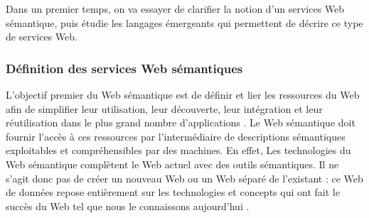 	    Dans un premier temps, on va essayer de clarifier la notion d'un services Web sémantique,
	    puis étudie les langages émergeants qui permettent de décrire ce type de services Web.
	    
	    \subsubsection{Définition des services Web sémantiques} 


	    



	    L'objectif premier du Web sémantique est de définir et lier les ressources du Web afin de simplifier
	    leur utilisation, leur découverte, leur intégration et leur réutilisation dans le plus grand nombre
	    d'applications \cite{berners2001semantic}. Le Web sémantique doit fournir l'accès à ces ressources par
	    l'intermédiaire de descriptions sémantiques exploitables et compréhensibles par des machines. En effet,
	    Les technologies du Web sémantique complètent le Web actuel avec des outils sémantiques. Il ne s'agit donc
	    pas de créer un nouveau Web ou un Web séparé de l'existant : ce Web de données repose entièrement sur
	    les technologies et concepts qui ont fait le succès du Web tel que nous le connaissons aujourd'hui
	    \cite{bertails2010web}.

